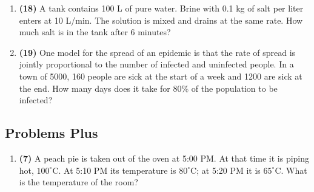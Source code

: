 \documentclass[12pt, a4paper]{article}
\begin{document}
\begin{enumerate}
    \item \textbf{(18)} A tank contains 100 L of pure water. Brine with 0.1 kg of salt per liter enters at 10 L/min. The solution is mixed and drains at the same rate. How much salt is in the tank after 6 minutes?

    \item \textbf{(19)} One model for the spread of an epidemic is that the rate of spread is jointly proportional to the number of infected and uninfected people. In a town of 5000, 160 people are sick at the start of a week and 1200 are sick at the end. How many days does it take for 80\% of the population to be infected?

\end{enumerate}

\hrulefill
\vspace{1em}

\subsection*{Problems Plus}
\begin{enumerate}
    \item \textbf{(7)} A peach pie is taken out of the oven at 5:00 PM. At that time it is piping hot, $100^{\circ}\text{C}$. At 5:10 PM its temperature is $80^{\circ}\text{C}$; at 5:20 PM it is $65^{\circ}\text{C}$. What is the temperature of the room?
\end{enumerate}
\end{document}
